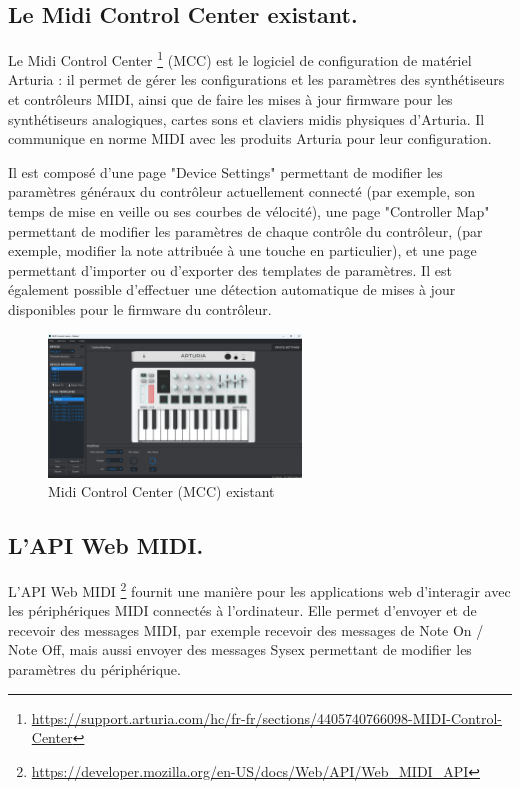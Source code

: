 \documentclass[francais]{rapportPFE}  %
\begin{document}
\subsection{Le Midi Control Center existant.}

Le Midi Control Center
\footnote{\url{https://support.arturia.com/hc/fr-fr/sections/4405740766098-MIDI-Control-Center}}
 (MCC) est le logiciel de configuration de matériel Arturia : il
permet de gérer les configurations et les paramètres des synthétiseurs et contrôleurs MIDI, ainsi que de faire les mises à jour firmware pour les synthétiseurs analogiques, cartes sons et claviers midis physiques d’Arturia. Il communique en norme MIDI avec les produits Arturia pour leur configuration.

Il est composé d'une page "Device Settings" permettant de modifier les paramètres généraux du contrôleur actuellement connecté (par exemple, son temps de mise en veille ou ses courbes de vélocité), une page "Controller Map" permettant de modifier les paramètres de chaque contrôle du contrôleur, (par exemple, modifier la note attribuée à une touche en particulier), et une page permettant d'importer ou d'exporter des templates de paramètres. Il est également possible d'effectuer une détection automatique de mises à jour disponibles pour le firmware du contrôleur.

\begin{figure}[!t]
	\centering
	\includegraphics[width=0.6\textwidth]{graphics/mcc_existant.png}
	\begin{tiny}
	\end{tiny}
	\caption{Midi Control Center (MCC) existant}
	\label{fig:Expe}
\end{figure}


\subsection{L'API Web MIDI.}

L'API Web MIDI
\footnote{\url{https://developer.mozilla.org/en-US/docs/Web/API/Web_MIDI_API}}
fournit une manière pour les applications web d'interagir avec les périphériques MIDI connectés à l'ordinateur. Elle permet d'envoyer et de recevoir des messages MIDI, par exemple recevoir des messages de Note On / Note Off, mais aussi envoyer des messages Sysex permettant de modifier les paramètres du périphérique.
\end{document}
